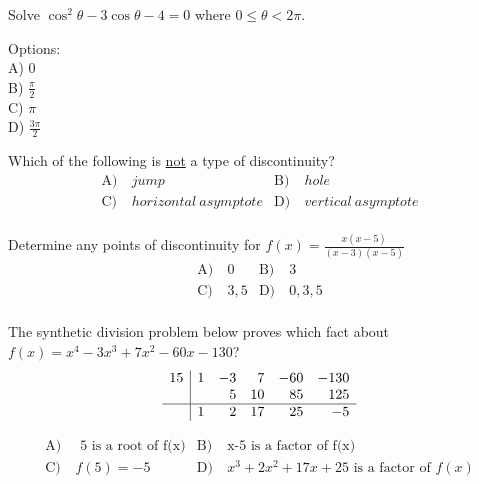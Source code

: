 \begin{problem}\label{AI-Trigonometry1}
Solve \( \cos^2\theta - 3\cos\theta - 4 = 0 \) where \( 0 \leq \theta < 2\pi \).

\noindent Options:\\
A) \( 0 \)\\
B) \( \frac{\pi}{2} \)\\
C) \( \pi \)\\
D) \( \frac{3\pi}{2} \)
\end{problem}


\begin{problem}\label{PreCal-7}
Which of the following is \underline{not} a type of discontinuity? 
\begin{align*}
\text{A)}\ & jump &
\text{B)}\ & hole  \\
\text{C)}\ & horizontal \ asymptote &
\text{D)}\ & vertical \ asymptote\\
\end{align*}    
\end{problem}


\begin{problem}\label{PreCal-8}
Determine any points of discontinuity for $f(x)=\frac{x(x-5)}{(x-3)(x-5)}$
\begin{align*}
\text{A)}\ & 0 &
\text{B)}\ & 3  \\
\text{C)}\ & 3,5 &
\text{D)}\ & 0,3,5\\
\end{align*}    
\end{problem}


\begin{problem}\label{PreCal-9}
The synthetic division problem below proves which fact about $f(x)=x^4-3x^3+7x^2-60x-130$?\\
\[
\begin{array}{r|rrrrr}
  15& 1 & -3 & 7 & -60 & -130 \\
    &   & 5 & 10  & 85 & 125\\
\hline
    & 1 & 2 & 17  & 25 & -5\\
\end{array}
\]

\begin{align*}
\text{A)}\ &  \text{ 5 is a root of f(x)} &
\text{B)}\ &   \text{x-5 is a factor of f(x)}\\
\text{C)}\ &  f(5)=-5 &
\text{D)}\ & x^3+2x^2+17x+25 \text{ is a factor of } f(x)\\
\end{align*}    
\end{problem}


